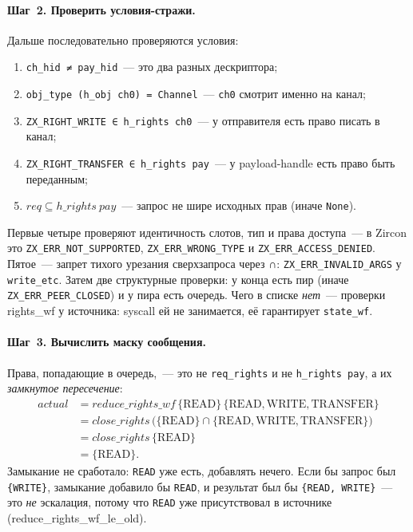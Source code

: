 \documentclass[11pt,a4paper]{article}
\newcommand{\isabel}[1]{{\isabelleit #1}}
\newcommand{\lemmaname}[1]{\isabel{#1}}
\begin{document}
\paragraph{Шаг~2. Проверить условия-стражи.}
Дальше последовательно проверяются условия:
\begin{enumerate}[leftmargin=1.4em]
	\item \texttt{ch\_hid ≠ pay\_hid}~--- это два разных дескриптора;
	\item \texttt{obj\_type (h\_obj ch0) = Channel}~--- \texttt{ch0} смотрит
	      именно на канал;
	\item \texttt{ZX\_RIGHT\_WRITE ∈ h\_rights ch0}~--- у отправителя есть
	      право писать в канал;
	\item \texttt{ZX\_RIGHT\_TRANSFER ∈ h\_rights pay}~--- у payload-handle
	      есть право быть переданным;
	\item $\mathit{req}\subseteq h\_rights~\mathit{pay}$~--- запрос не шире
	      исходных прав (иначе \texttt{None}).
\end{enumerate}
Первые четыре проверяют идентичность слотов, тип и права доступа~---
в Zircon это \texttt{ZX\_ERR\_NOT\_SUPPORTED}, \texttt{ZX\_ERR\_WRONG\_TYPE}
и \texttt{ZX\_ERR\_ACCESS\_DENIED}. Пятое~--- запрет тихого урезания
сверхзапроса через ∩: \texttt{ZX\_ERR\_INVALID\_ARGS} у
\texttt{write\_etc}. Затем две структурные проверки: у конца есть пир
(иначе \texttt{ZX\_ERR\_PEER\_CLOSED}) и у пира есть очередь. Чего в
списке \emph{нет}~--- проверки \lemmaname{rights\_wf} у источника:
syscall ей не занимается, её гарантирует \texttt{state\_wf}.

\paragraph{Шаг~3. Вычислить маску сообщения.}
Права, попадающие в очередь,~--- это не \texttt{req\_rights} и не
\texttt{h\_rights pay}, а их \emph{замкнутое пересечение}:
\[
	\begin{aligned}
		\mathit{actual}
		 & = \mathit{reduce\_rights\_wf}\,\{\mathrm{READ}\}\,
		\{\mathrm{READ}, \mathrm{WRITE}, \mathrm{TRANSFER}\}       \\
		 & = \mathit{close\_rights}\,
		\bigl(\{\mathrm{READ}\} \cap
		\{\mathrm{READ}, \mathrm{WRITE}, \mathrm{TRANSFER}\}\bigr) \\
		 & = \mathit{close\_rights}\,\{\mathrm{READ}\}             \\
		 & = \{\mathrm{READ}\}.
	\end{aligned}
\]
Замыкание не сработало: \texttt{READ} уже есть, добавлять нечего. Если
бы запрос был \texttt{\{WRITE\}}, замыкание добавило бы \texttt{READ},
и результат был бы \texttt{\{READ, WRITE\}}~--- это \emph{не}
эскалация, потому что \texttt{READ} уже присутствовал в источнике
(\lemmaname{reduce\_rights\_wf\_le\_old}).
\end{document}
